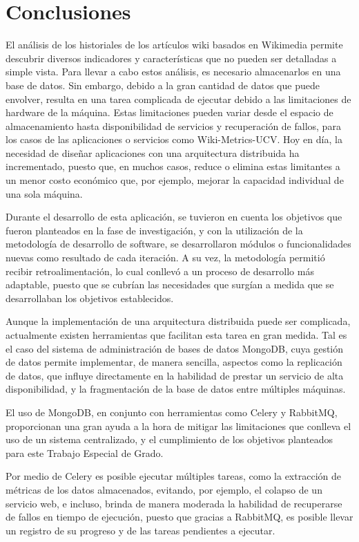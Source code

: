 \section{Conclusiones}

El análisis de los historiales de los artículos wiki basados en Wikimedia permite
descubrir diversos indicadores y características que no pueden ser detalladas a simple
vista.
Para llevar a cabo estos análisis, es necesario almacenarlos en una base
de datos. Sin embargo, debido a la gran cantidad de datos que puede envolver, resulta
en una tarea complicada de ejecutar debido a las limitaciones de hardware de la
máquina.
Estas limitaciones pueden variar desde el espacio de almacenamiento hasta disponibilidad
de servicios y recuperación de fallos, para los casos de las aplicaciones o servicios como
Wiki-Metrics-UCV.
Hoy en día, la necesidad de diseñar aplicaciones con una arquitectura distribuida
ha incrementado, puesto que, en muchos casos, reduce o elimina estas limitantes
a un menor costo económico que, por ejemplo, mejorar la capacidad individual de una sola máquina.

Durante el desarrollo de esta aplicación, 
se tuvieron en cuenta los objetivos que fueron planteados en la fase de investigación, 
y con la utilización de la metodología de desarrollo de software, 
se desarrollaron módulos o funcionalidades nuevas como resultado de cada iteración. 
A su vez, la metodología permitió recibir retroalimentación, 
lo cual conllevó a un proceso de desarrollo más adaptable, 
puesto que se cubrían las necesidades que surgían a medida que se desarrollaban los objetivos establecidos.

Aunque la implementación de una arquitectura distribuida puede ser complicada,
actualmente existen herramientas que facilitan esta tarea en gran medida.
Tal es el caso del sistema de administración de bases de datos MongoDB, cuya gestión
de datos permite implementar, de manera sencilla, aspectos como la replicación de datos, 
que influye directamente en la habilidad de prestar un servicio de alta disponibilidad,
y la fragmentación de la base de datos entre múltiples máquinas.

El uso de MongoDB, en conjunto con herramientas como Celery y RabbitMQ, proporcionan
una gran ayuda a la hora de mitigar las limitaciones que conlleva el uso de un sistema centralizado, y el cumplimiento de los objetivos planteados para este Trabajo Especial de Grado.

Por medio de Celery es posible ejecutar múltiples tareas, como la extracción de métricas de los
datos almacenados, evitando, por ejemplo, el colapso de un servicio web, e incluso, brinda
de manera moderada la habilidad de recuperarse de fallos en tiempo de ejecución, puesto que gracias a RabbitMQ,
es posible llevar un registro de su progreso y de las tareas pendientes a ejecutar.

